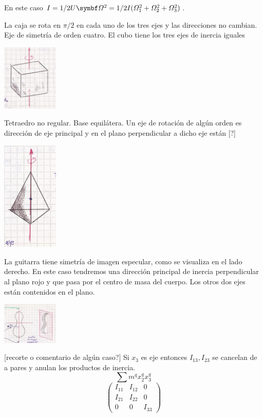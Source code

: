 \documentclass[10pt,oneside]{CBFT_book}
\begin{document}
En este caso $I = 1/2 U \vb{\Omega}^2 = 1/2 I ( \Omega_1^2 + \Omega_2^2 + \Omega_3^2 )$.

La caja se rota en $\pi/2$ en cada uno de los tres ejes y las direcciones no cambian. Eje de simetría de orden cuatro.
El cubo tiene los tres ejes de inercia iguales

\includegraphics[width=0.2\textwidth]{images/fig_mc_inercia_simetrias_3.jpg}

Tetraedro no regular. Base equilátera. Un eje de rotación de algún orden es dirección de eje principal y en el
plano perpendicular a dicho eje están [?]

\includegraphics[width=0.2\textwidth]{images/fig_mc_inercia_simetrias_4.jpg}

La guitarra tiene simetría de imagen especular, como se visualiza en el lado derecho. En este caso tendremos
una dirección principal de inercia perpendicular al plano rojo y que pasa por el centro de masa del cuerpo.
Los otros dos ejes están contenidos en el plano.

\includegraphics[width=0.2\textwidth]{images/fig_mc_inercia_simetrias_5.jpg}

[recorte o comentario de algún caso?]
Si $x_3$  es eje entonces $I_{13}, I_{23}$ se cancelan de a pares y anulan los productos de inercia.
\[
	\sum m^q x_2^q x_3^q 
\]
\[
	\begin{pmatrix}
	I_{11} & I_{12} & 0 \\
	I_{21} & I_{22} & 0 \\
	 0 & 0 & I_{33} 
	\end{pmatrix}
\]
\end{document}
